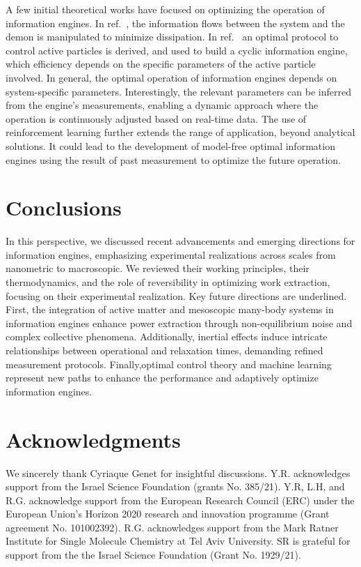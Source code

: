 \documentclass[aps, twocolumn,floatfix,showpacs, superscriptaddress]{revtex4-2}
\newcommand{\ie}{information engines }
\begin{document}
A few initial theoretical works have focused on optimizing the operation of information engines.
In ref.~\cite{kamijima2024finite}, the information flows between the system and the demon is manipulated to minimize dissipation.
In ref.~\cite{garcia2024optimal} an optimal protocol to control active particles is derived, and used to build a cyclic information engine, which efficiency depends on the specific parameters of the active particle involved.
In general, the optimal operation of information engines depends on system-specific parameters. Interestingly, the relevant parameters can be inferred from the engine's measurements, enabling a dynamic approach where the operation is continuously adjusted based on real-time data.
The use of reinforcement learning \cite{Whitelam2023, barros2024learning} further extends the range of application, beyond analytical solutions.
It could lead to the development of model-free optimal information engines using the result of past measurement to optimize the future operation.

\section{Conclusions}
\label{Sec:Conclusions}


In this perspective, we discussed recent advancements and emerging directions for information engines, emphasizing experimental realizations across scales from nanometric to macroscopic. We reviewed their working principles, their thermodynamics, and the role of reversibility in optimizing work extraction, focusing on their experimental realization. Key future directions are underlined.
First, the integration of active matter and mesoscopic many-body systems in \ie  enhance power extraction through non-equilibrium noise and complex collective phenomena. Additionally, inertial effects induce intricate relationships between operational and relaxation times, demanding refined measurement protocols. Finally,optimal control theory and machine learning represent new paths to enhance the performance and adaptively optimize information engines.

\section*{Acknowledgments}
We sincerely thank Cyriaque Genet for insightful discussions.
Y.R. acknowledges support from the Israel Science Foundation (grants No. 385/21). Y.R, L.H, and R.G. acknowledge support from the European Research Council (ERC) under the European Union’s Horizon 2020 research and innovation programme (Grant agreement No. 101002392). R.G. acknowledges support from the Mark Ratner Institute for Single Molecule Chemistry at Tel Aviv University.
SR is grateful for support from the the Israel Science Foundation (Grant No. 1929/21).
\end{document}
